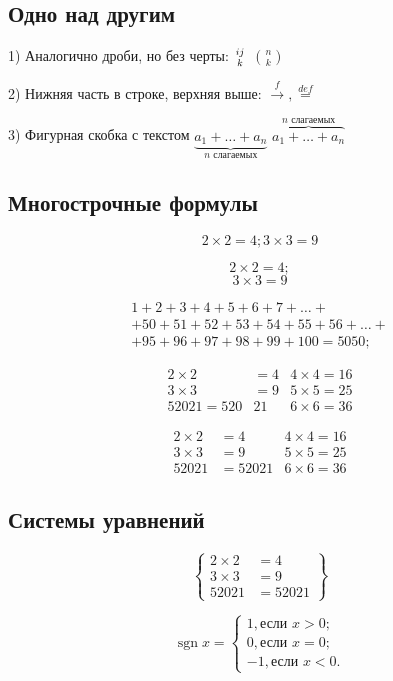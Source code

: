 \documentclass[a4paper,12pt]{article} %
\DeclareMathOperator{\sgn}{\mathop{sgn}}
\begin{document}
\subsection{Одно над другим}

1) Аналогично дроби, но без черты: $ij\atop k$ $n \choose k$

2) Нижняя часть в строке, верхняя выше: $\stackrel{f}{\longrightarrow}, \stackrel{def}{=}$

3) Фигурная скобка с текстом $\underbrace{a_1+\ldots+a_n}_{n \text{ слагаемых}}$ $\overbrace{a_1+\ldots+a_n}^{n \text{ слагаемых}}$



\subsection{Многострочные формулы}

$$
2\times 2=4;
3\times 3=9
$$

$$
2\times 2=4;
$$
$$
3\times 3=9
$$

\begin{multline}
	1+2+3+4+5+6+7+\ldots+\\+50+51+52+53+54+55+56+\ldots+\\+95+96+97+98+99+100=5050;
\end{multline}

\begin{align}
	2\times 2&=4  & 4\times 4=16 \\
	3\times 3&=9 & 5\times 5=25 \\
	52021 =520&21 & 6\times 6 =36
\end{align}

$$
\begin{aligned}
	2\times 2&=4  & 4\times 4=16\\
	3\times 3&=9 & 5\times 5=25\\
	52021&=52021 & 6\times 6 =36
\end{aligned}
$$

\subsection{Системы уравнений}

$$
\left\{
\begin{aligned}
	2\times 2&=4\\
	3\times 3&=9\\
	52021&=52021
\end{aligned}
\right\}
$$

$$
\sgn x= \begin{cases} %
	1, \text{если } x>0;\\
	0, \text{если } x=0;\\
	-1, \text{если } x<0.
\end{cases}
$$
\end{document}
